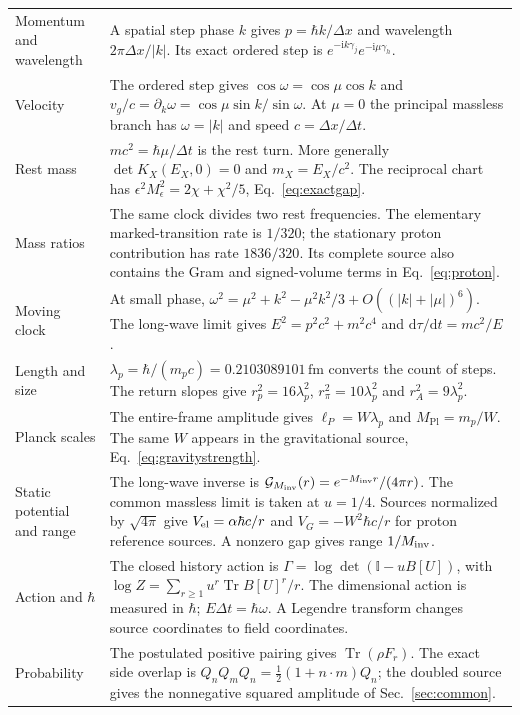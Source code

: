 \documentclass[aps,prx,onecolumn,10pt,notitlepage,nofootinbib,longbibliography]{revtex4-2}
\numberwithin{equation}{section}
\numberwithin{table}{section}
\newcommand{\Id}{\mathbb I}
\newcommand{\Tr}{\operatorname{Tr}}
\newcommand{\dd}{\mathrm d}
\newcommand{\ii}{\mathrm i}
\newcommand{\fm}{\,\mathrm{fm}}
\newcommand{\MP}{M_{\mathrm{Pl}}}
\begin{document}
\begin{longtable}{@{}>{\raggedright\arraybackslash}p{}>{\raggedright\arraybackslash}p{}@{}}
Momentum and wavelength&A spatial step phase $k$ gives $p=\hbar k/\Delta x$ and wavelength $2\pi\Delta x/|k|$. Its exact ordered step is $e^{-\ii k\gamma_j}e^{-\ii\mu\gamma_h}$.\\[4pt]
Velocity&The ordered step gives $\cos\omega=\cos\mu\cos k$ and $v_g/c=\partial_k\omega=\cos\mu\sin k/\sin\omega$. At $\mu=0$ the principal massless branch has $\omega=|k|$ and speed $c=\Delta x/\Delta t$.\\[4pt]
Rest mass&$mc^2=\hbar\mu/\Delta t$ is the rest turn. More generally $\det K_X(E_X,0)=0$ and $m_X=E_X/c^2$. The reciprocal chart has $\epsilon^2M_\epsilon^2=2\chi+\chi^2/5$, Eq.~\eqref{eq:exactgap}.\\[4pt]
Mass ratios&The same clock divides two rest frequencies. The elementary marked-transition rate is $1/320$; the stationary proton contribution has rate $1836/320$. Its complete source also contains the Gram and signed-volume terms in Eq.~\eqref{eq:proton}.\\[4pt]
Moving clock&At small phase, $\omega^2=\mu^2+k^2-\mu^2k^2/3+O((|k|+|\mu|)^6)$. The long-wave limit gives $E^2=p^2c^2+m^2c^4$ and $\dd\tau/\dd t=mc^2/E$.\\[4pt]
Length and size&$\lambda_p=\hbar/(m_pc)=0.2103089101\fm$ converts the count of steps. The return slopes give $r_p^2=16\lambda_p^2$, $r_\pi^2=10\lambda_p^2$ and $r_A^2=9\lambda_p^2$.\\[4pt]
Planck scales&The entire-frame amplitude gives $\ell_P=W\lambda_p$ and $\MP=m_p/W$. The same $W$ appears in the gravitational source, Eq.~\eqref{eq:gravitystrength}.\\[4pt]
Static potential and range&The long-wave inverse is $\mathcal G_{M_{\rm inv}}(r)=e^{-M_{\rm inv}r}/(4\pi r)$. The common massless limit is taken at $u=1/4$. Sources normalized by $\sqrt{4\pi}$ give $V_{\rm el}=\alpha\hbar c/r$ and $V_G=-W^2\hbar c/r$ for proton reference sources. A nonzero gap gives range $1/M_{\rm inv}$.\\[4pt]
Action and $\hbar$&The closed history action is $\Gamma=\log\det(\Id-uB[U])$, with $\log Z=\sum_{r\ge1}u^r\Tr B[U]^r/r$. The dimensional action is measured in $\hbar$; $E\Delta t=\hbar\omega$. A Legendre transform changes source coordinates to field coordinates.\\[4pt]
Probability&The postulated positive pairing gives $\Tr(\rho F_r)$. The exact side overlap is $Q_nQ_mQ_n=\tfrac12(1+n\cdot m)Q_n$; the doubled source gives the nonnegative squared amplitude of Sec.~\ref{sec:common}.\\[4pt]

\end{longtable}
\end{document}
